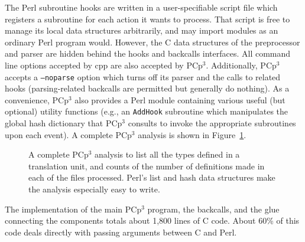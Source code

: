 \documentclass{article}
\newcommand{\pcp}{\mbox{\textsf{PCp}$^3$}}
\newcommand{\Cpp}{\mbox{\textsf{cpp}}}
\newcommand{\Perl}{\mbox{Perl}}
\newcommand{\C}{\mbox{C}}
\newcommand{\eg}{e.g.,}
\newcommand{\figref}[1]{Figure~\ref{#1}}
\begin{document}
\noindent The \Perl{} subroutine hooks are written in a user-specifiable script
file which registers a subroutine for each action it wants to process.
That script is free to manage its local data structures arbitrarily, and
may import modules as an ordinary \Perl{} program would.  However, the
\C{} data structures of the preprocessor and parser are hidden behind the hooks and backcalls
interfaces. All command line options accepted by \Cpp{} are also
accepted by \pcp{}.  Additionally, \pcp{} accepts a \texttt{--noparse}
option which turns off its parser and the calls to related hooks
(parsing-related backcalls are permitted but generally do nothing).  As
a convenience, \pcp{} also provides a \Perl{} module containing various
useful (but optional) utility functions (\eg{} an \texttt{AddHook}
subroutine which manipulates the global hash dictionary
that \pcp{} consults to invoke the appropriate subroutines upon each
event). A complete \pcp{} analysis is shown in
\figref{fig:complete_analysis}.

\begin{figure}[hbtp]
\begin{center}
\begin{small}
\end{small}
\caption{A complete \pcp{} analysis to list all the types defined in a
  translation unit, and counts of the number of definitions made in each
  of the files processed.  \Perl{}'s list and hash data structures make
  the analysis especially easy to write.}
\label{fig:complete_analysis}
\end{center}
\end{figure}


The implementation of the main \pcp{} program, the backcalls, and the
glue connecting the components totals about 1,800 lines of \C{}
code.  About 60\% of this code deals directly with passing arguments
between \C{} and \Perl{}.
\end{document}
